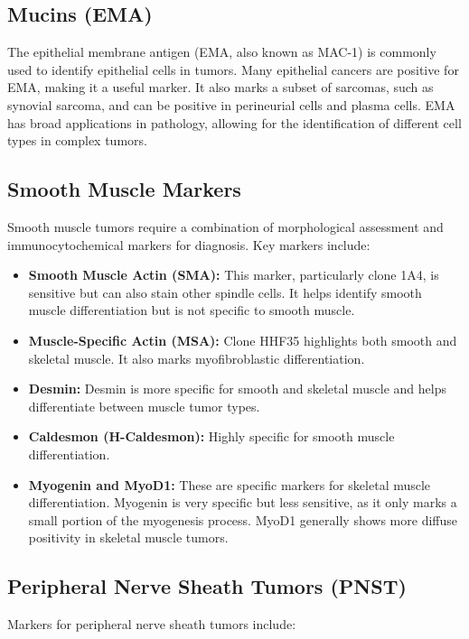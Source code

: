 \subsection{Mucins (EMA)}
The epithelial membrane antigen (EMA, also known as MAC-1) is commonly used to identify epithelial cells in tumors. Many epithelial cancers are positive for EMA, making it a useful marker. It also marks a subset of sarcomas, such as synovial sarcoma, and can be positive in perineurial cells and plasma cells. EMA has broad applications in pathology, allowing for the identification of different cell types in complex tumors.

\subsection{Smooth Muscle Markers}
Smooth muscle tumors require a combination of morphological assessment and immunocytochemical markers for diagnosis. Key markers include:

\begin{itemize}
    \item \textbf{Smooth Muscle Actin (SMA):} This marker, particularly clone 1A4, is sensitive but can also stain other spindle cells. It helps identify smooth muscle differentiation but is not specific to smooth muscle.
    \item \textbf{Muscle-Specific Actin (MSA):} Clone HHF35 highlights both smooth and skeletal muscle. It also marks myofibroblastic differentiation.
    \item \textbf{Desmin:} Desmin is more specific for smooth and skeletal muscle and helps differentiate between muscle tumor types.
    \item \textbf{Caldesmon (H-Caldesmon):} Highly specific for smooth muscle differentiation.
    \item \textbf{Myogenin and MyoD1:} These are specific markers for skeletal muscle differentiation. Myogenin is very specific but less sensitive, as it only marks a small portion of the myogenesis process. MyoD1 generally shows more diffuse positivity in skeletal muscle tumors.
\end{itemize}

\subsection{Peripheral Nerve Sheath Tumors (PNST)}
Markers for peripheral nerve sheath tumors include:

